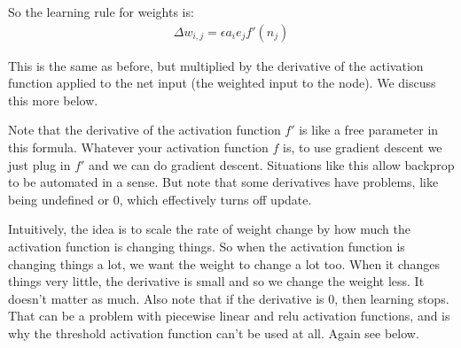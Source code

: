 So the learning rule for weights is:
\begin{eqnarray*}
\Delta w_{i,j}  =  \epsilon a_i e_j f'(n_j)
\end{eqnarray*} 

This is the same as before, but multiplied by the derivative of the activation function applied to the net input (the weighted input to the node). We discuss this more below. 

Note that the derivative of the activation function $f'$ is like a free parameter in this formula. Whatever your activation function $f$ is, to use gradient descent we just plug in $f'$ and we can do gradient descent. Situations like this allow backprop to be automated in a sense. But note that some derivatives have problems, like being undefined or 0, which effectively turns off update.

Intuitively, the idea is to scale the rate of weight change by how much the activation function is changing things. So when the activation function is changing things a lot, we want the weight to change a lot too. When it changes things very little, the derivative is small and so we change the weight less. It doesn't matter as much. Also note that if the derivative is 0, then learning stops. That can be a problem with piecewise linear and relu activation functions, and is why the threshold activation function can't be used at all. Again see below.

